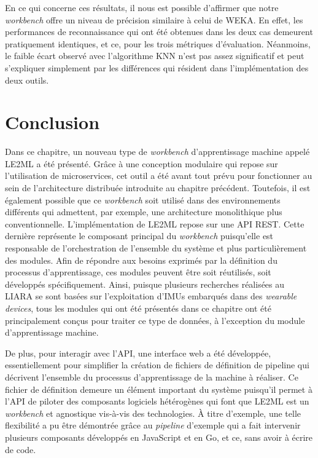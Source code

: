 En ce qui concerne ces résultats, il nous est possible d'affirmer que notre \textit{workbench} offre un niveau de précision similaire à celui de \acs{WEKA}. En effet, les performances de reconnaissance qui ont été obtenues dans les deux cas demeurent pratiquement identiques, et ce, pour les trois métriques d'évaluation. Néanmoins, le faible écart observé avec l'algorithme \acs{KNN} n'est pas assez significatif et peut s'expliquer simplement par les différences qui résident dans l'implémentation des deux outils.

\section{Conclusion}

Dans ce chapitre, un nouveau type de \textit{workbench} d'apprentissage machine appelé \ac{LE2ML} a été présenté. Grâce à une conception modulaire qui repose sur l'utilisation de microservices, cet outil a été avant tout prévu pour fonctionner au sein de l'architecture distribuée introduite au chapitre précédent. Toutefois, il est également possible que ce \textit{workbench} soit utilisé dans des environnements différents qui admettent, par exemple, une architecture monolithique plus conventionnelle. L'implémentation de \acs{LE2ML} repose sur une \acs{API} \acs{REST}. Cette dernière représente le composant principal du \textit{workbench} puisqu'elle est responsable de l'orchestration de l'ensemble du système et plus particulièrement des modules. Afin de répondre aux besoins exprimés par la définition du processus d'apprentissage, ces modules peuvent être soit réutilisés, soit développés spécifiquement. Ainsi, puisque plusieurs recherches réalisées au \acs{LIARA} se sont basées sur l'exploitation d'\acsp{IMU} embarqués dans des \textit{wearable devices}, tous les modules qui ont été présentés dans ce chapitre ont été principalement conçus pour traiter ce type de données, à l'exception du module d'apprentissage machine.

De plus, pour interagir avec l'\acs{API}, une interface web a été développée, essentiellement pour simplifier la création de fichiers de définition de pipeline qui décrivent l'ensemble du processus d'apprentissage de la machine à réaliser. Ce fichier de définition demeure un élément important du système puisqu'il permet à l'API de piloter des composants logiciels hétérogènes qui font que \acs{LE2ML} est un \textit{workbench} et agnostique vis-à-vis des technologies. À titre d'exemple, une telle flexibilité a pu être démontrée grâce au \textit{pipeline} d'exemple qui a fait intervenir plusieurs composants développés en JavaScript et en Go, et ce, sans avoir à écrire de code.

